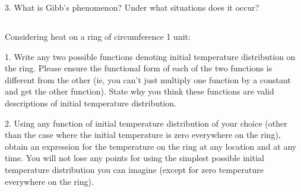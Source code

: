3. What is Gibb's phenomenon? Under what situations does it occur?




\subsection{}

Considering heat on a ring of circumference 1 unit:

1. Write any two possible functions denoting initial temperature distribution on the ring. Please ensure the functional form of each of the two functions is different from the other (ie, you can't just multiply one function by a constant and get the other function). State why you think these functions are valid descriptions of initial temperature distribution.

2. Using any function of initial temperature distribution of your choice (other than the case where the initial temperature is zero everywhere on the ring), obtain an expression for the temperature on the ring at any location and at any time. You will not lose any points for using the simplest possible initial temperature distribution you can imagine (except for zero temperature everywhere on the ring).

